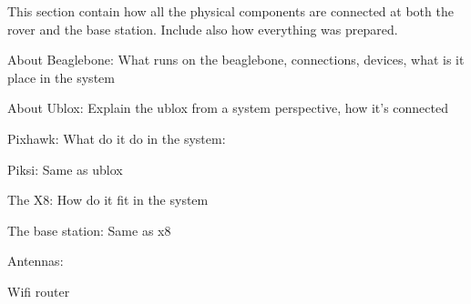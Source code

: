 This section contain how all the physical components are connected at both the rover and the base station. Include also how everything was prepared.

About Beaglebone: What runs on the beaglebone, connections, devices, what is it place in the system

About Ublox: Explain the ublox from a system perspective, how it's connected

Pixhawk: What do it do in the system:

Piksi: Same as ublox

The X8: How do it fit in the system

The base station: Same as x8

Antennas: 

Wifi router

